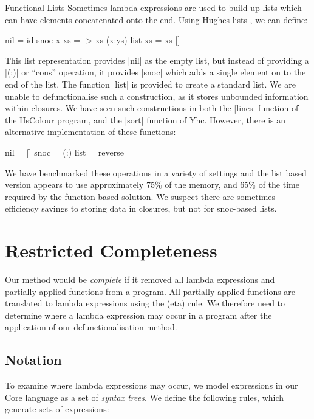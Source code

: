 \documentclass[preprint]{sigplanconf}
\begin{document}
\begin{examplename}{Functional Lists}
\label{ex:functional_lists}
Sometimes lambda expressions are used to build up lists which can have elements concatenated onto the end. Using Hughes lists \cite{hughes:lists}, we can define:

\begin{code}
nil = id
snoc x xs = \ys -> xs (x:ys)
list xs = xs []
\end{code}

This list representation provides |nil| as the empty list, but instead of providing a |(:)| or ``cons'' operation, it provides |snoc| which adds a single element on to the end of the list. The function |list| is provided to create a standard list. We are unable to defunctionalise such a construction, as it stores unbounded information within closures. We have seen such constructions in both the |lines| function of the HsColour program, and the |sort| function of Yhc. However, there is an alternative implementation of these functions:

\begin{code}
nil = []
snoc = (:)
list = reverse
\end{code}

We have benchmarked these operations in a variety of settings and the list based version appears to use approximately 75\% of the memory, and 65\% of the time required by the function-based solution. We suspect there are sometimes efficiency savings to storing data in closures, but not for snoc-based lists.
\end{examplename}


\section{Restricted Completeness}
\label{sec:completeness}

Our method would be \textit{complete} if it removed all lambda expressions and partially-applied functions from a program. All partially-applied functions are translated to lambda expressions using the (eta) rule. We therefore need to determine where a lambda expression may occur in a program after the application of our defunctionalisation method.

\subsection{Notation}

To examine where lambda expressions may occur, we model expressions in our Core language as a set of \textit{syntax trees}. We define the following rules, which generate sets of expressions:
\end{document}
